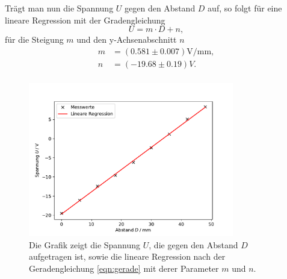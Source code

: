     Trägt man nun die Spannung $U$ gegen den Abstand $D$ auf, so folgt für eine lineare 
    Regression mit der Gradengleichung  
    \begin{equation}
        U=m\cdot D + n,
        \label{eqn:gerade}
    \end{equation}
    für die Steigung $m$ und den y-Achsenabschnitt $n$
    \begin{align*}
        m&=(0.581\pm0.007) \si{\volt\per\mm},\\
        n&=(-19.68\pm0.19) \si{V}.\\
    \end{align*}
    \begin{figure}[H]
        \centering
        \includegraphics[width=0.8\textwidth]{plot.pdf}
        \caption{Die Grafik zeigt die Spannung $U$, die gegen den Abstand $D$ aufgetragen ist, sowie 
        die lineare Regression nach der Geradengleichung \ref{eqn:gerade} mit derer Parameter $m$ und $n$.}
    \end{figure}